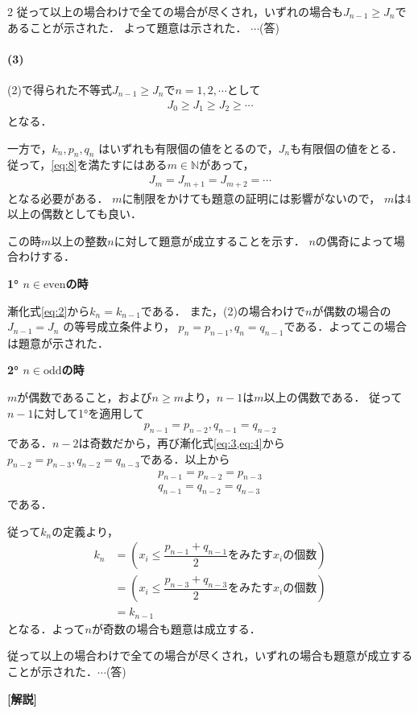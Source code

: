 \documentclass[../../main.tex]{subfiles}
\begin{document}
\begin{multicols}{2}
  従って以上の場合わけで全ての場合が尽くされ，いずれの場合も$J_{n-1}\ge J_{n}$であることが示された．
  よって題意は示された．  $\cdots$(答)

  \paragraph{(3)}
  (2)で得られた不等式$J_{n-1} \ge J_{n}$で$n=1,2,\cdots$として
  \begin{align}
    J_0 \ge J_1 \ge J_2 \ge \cdots \label{eq:8}
  \end{align}
  となる．

  一方で，$k_n, p_n, q_n$ はいずれも有限個の値をとるので，$J_n$も有限個の値をとる．
  従って，\cref{eq:8}を満たすにはある$m \in \mathbb{N}$があって，
  \begin{align}
    J_m = J_{m+1} = J_{m+2} = \cdots
  \end{align}
  となる必要がある．
  $m$に制限をかけても題意の証明には影響がないので，
  $m$は4以上の偶数としても良い．

  この時$m$以上の整数$n$に対して題意が成立することを示す．
  $n$の偶奇によって場合わけする．

  \textbf{1° $n\in \text{even}$の時}

  漸化式\cref{eq:2}から$k_n=k_{n-1}$である．
  また，(2)の場合わけで$n$が偶数の場合の $J_{n-1}=J_n$ の等号成立条件より，
  $p_n=p_{n-1}, q_n=q_{n-1}$である．よってこの場合は題意が示された．

  \textbf{2° $n\in \text{odd}$の時}

  $m$が偶数であること，および$n \ge m$より，$n-1$は$m$以上の偶数である．
  従って$n-1$に対して1°を適用して
  \begin{align}
    p_{n-1}=p_{n-2}, q_{n-1}=q_{n-2}
  \end{align}
  である．$n-2$は奇数だから，再び漸化式\cref{eq:3,eq:4}から
  $p_{n-2}=p_{n-3}, q_{n-2}=q_{n-3}$である．以上から
  \begin{align}
    p_{n-1} = p_{n-2} = p_{n-3} \\
    q_{n-1} = q_{n-2} = q_{n-3}
  \end{align}
  である．

  従って$k_n$の定義より，
  \begin{align}
    k_n & = \left( x_i \le \dfrac{p_{n-1}+q_{n-1}}{2} \text{をみたす} x_i \text{の個数} \right) \\
    & = \left( x_i \le \dfrac{p_{n-3}+q_{n-3}}{2} \text{をみたす} x_i \text{の個数} \right) \\
    & = k_{n-1}
  \end{align}
  となる．よって$n$が奇数の場合も題意は成立する．

  従って以上の場合わけで全ての場合が尽くされ，いずれの場合も題意が成立することが示された．$\cdots$(答)

  {\bf [解説]}

  \newpage
\end{multicols}
\end{document}
